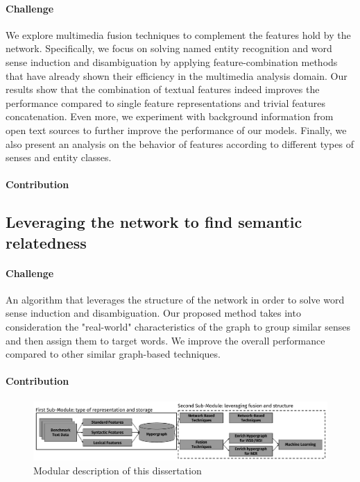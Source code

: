 \paragraph{Challenge}

 We explore multimedia fusion techniques to complement the features hold by the network. Specifically, we focus on solving named entity recognition and word sense induction and disambiguation by applying feature-combination methods that have already shown their efficiency in the multimedia analysis domain.  Our results show that the combination of textual features indeed improves the performance compared to single feature representations and trivial features concatenation. Even more, we experiment with background information from open text sources to further improve the performance of our models. Finally, we also present an analysis on the behavior of features according to different types of senses and entity classes.



\paragraph{Contribution}
\newpage
\subsection{Leveraging the network to find semantic relatedness}
\paragraph{Challenge}
An algorithm that leverages  the structure of the network in order to solve word sense induction and disambiguation. Our proposed method takes into consideration the "real-world" characteristics of the graph to group similar senses and then assign them to target words. We  improve the overall performance compared to other similar graph-based techniques.

\paragraph{Contribution}






\begin{figure}
\centering
\includegraphics[width=1\linewidth]{./images/Chapitre1/main_diag2.pdf}
\caption{Modular description of this dissertation}
\label{fig:maindiag}
\end{figure}





